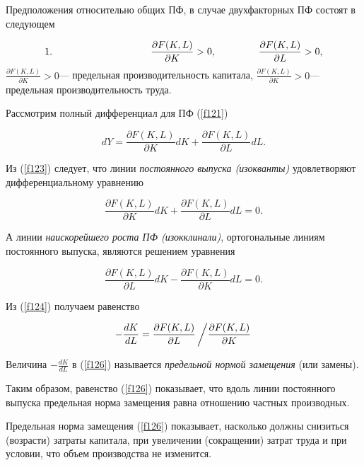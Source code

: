 \documentclass[12pt,openbib]{report}
\begin{document}
Предположения относительно общих ПФ, в случае
двухфакторных ПФ состоят в следующем

\begin{equation}\label{f122}
1.\hspace{35mm}\frac{\partial F(K,L)}{\partial K}>0,\hspace{15mm}\frac{\partial F(K,L)}{\partial
L}>0,
\end{equation}
$\frac{\partial F(K,L)}{\partial K}>0$---
предельная производительность капитала, $\frac{\partial
F(K,L)}{\partial K}>0$--- предельная производительность труда.

Рассмотрим полный дифференциал для ПФ (\ref{f121})

\begin{equation}\label{f123}
dY=\frac{\partial
F(K,L)}{\partial K}dK+\frac{\partial F(K,L)}{\partial
L}dL.
\end{equation}

Из (\ref{f123}) следует, что линии {\it постоянного выпуска (изокванты)}
удовлетворяют дифференциальному уравнению

\begin{equation}\label{f124}
\frac{\partial
F(K,L)}{\partial K}dK+\frac{\partial F(K,L)}{\partial
L}dL=0.
\end{equation}

А линии {\it наискорейшего роста ПФ (изокклинали)}, ортогональные
линиям постоянного выпуска, являются решением уравнения

\begin{equation}\label{f125}
\frac{\partial F(K,L)}{\partial L}dK-\frac{\partial F(K,L)}{\partial
K} dL=0.
\end{equation}

Из (\ref{f124}) получаем равенство

\begin{equation}\label{f126}
-\frac{dK}{dL}=\frac{\partial F(K,L)}{\partial L}\left/\frac{\partial F(K,L)}{\partial
K}\right.
\end{equation}

Величина $-\frac{dK}{dL}$ в (\ref{f126}) называется {\it предельной
нормой замещения} (или замены).

Таким образом, равенство (\ref{f126}) показывает, что вдоль линии
постоянного выпуска предельная норма замещения равна отношению
частных производных.

Предельная норма замещения (\ref{f126}) показывает, насколько должны
снизиться (возрасти) затраты капитала, при увеличении (сокращении)
затрат труда и при условии, что объем производства не изменится.
\end{document}
